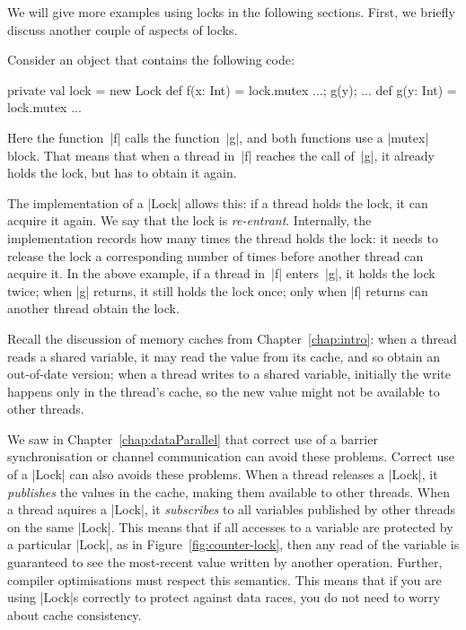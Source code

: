 We will give more examples using locks in the following sections.  First,
we briefly discuss another couple of aspects of locks.  

Consider an object that contains the following code:
%
\begin{scala}
  private val lock = new Lock
  def f(x: Int) = lock.mutex{ ...; g(y); ... }
  def g(y: Int) = lock.mutex{ ... }
\end{scala}
%
Here the function~|f| calls the function~|g|, and both functions use a |mutex|
block.  That means that when a thread in~|f| reaches the call of~|g|, it
already holds the lock, but has to obtain it again.

The implementation of a |Lock| allows this: if a thread holds the lock, it can
acquire it again.  We say that the lock is
\emph{re-entrant}.  Internally, the implementation records
how many times the thread holds the lock: it needs to release the lock a
corresponding number of times before another thread can acquire it.  In the
above example, if a thread in~|f| enters~|g|, it holds the lock twice; when
|g| returns, it still holds the lock once; only when |f| returns can another
thread obtain the lock.


Recall the discussion of memory caches from Chapter~\ref{chap:intro}: when a
thread reads a shared variable, it may read the value from its cache, and so
obtain an out-of-date version; when a thread writes to a shared variable,
initially the write happens only in the thread's cache, so the new value might
not be available to other threads.

We saw in Chapter~\ref{chap:dataParallel} that correct use of a barrier
synchronisation or channel communication can avoid these problems.  Correct
use of a |Lock| can also avoids these problems.  When a thread releases a
|Lock|, it \emph{publishes} the values in the cache, making
them available to other threads.  When a thread aquires a |Lock|, it
\emph{subscribes} to all variables published by other threads
on the same |Lock|.  This means that if all accesses to a variable are
protected by a particular |Lock|, as in Figure~\ref{fig:counter-lock}, then
any read of the variable is guaranteed to see the most-recent value written by
another operation.  Further, compiler optimisations must respect this
semantics.  This means that if you are using |Lock|s correctly to protect
against data races, you do not need to worry about cache
consistency.


